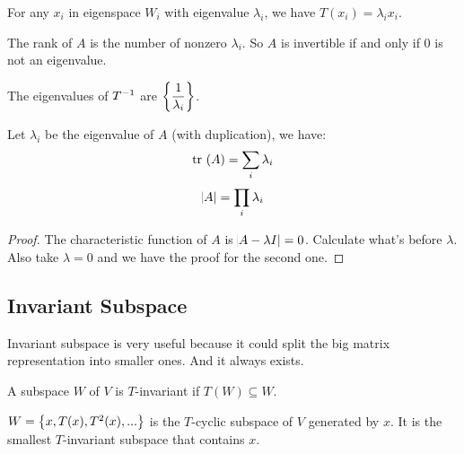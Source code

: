 \begin{theorem}
    For any $x_i$ in eigenspace $W_i$ with eigenvalue $\lambda_i$, we have $T(x_i) = \lambda_i x_i$.
\end{theorem}

\begin{theorem}
    The rank of $A$ is the number of nonzero $\lambda_i$. So $A$ is invertible if and only if $0$ is not an eigenvalue.    
\end{theorem}

\begin{theorem}
    The eigenvalues of ${T}^{-1}$ are $\displaystyle \set{\frac{1}{\lambda_i}}$.
\end{theorem}


\begin{theorem}
    Let $\lambda_i$ be the eigenvalue of $A$ (with duplication), we have:
    \begin{equation}
        \displaystyle \mathrm{tr}~( A ) = \sum_i \lambda_i
    \end{equation}
    \begin{equation}
        \abs{A} = \prod_i \lambda_i
    \end{equation}
\end{theorem}
\begin{proof}
    The characteristic function of $A$ is $\abs{A - \lambda I} = 0$. Calculate what's before $\lambda$. Also take $\lambda=0$ and we have the proof for the second one.
\end{proof}



\subsection{Invariant Subspace}

Invariant subspace is very useful because it could split the big matrix representation into smaller ones. And it always exists.

\begin{definition}[$T$-invariant]
    A subspace $W$ of $V$ is $T$-invariant if $T(W) \subseteq W$.
\end{definition}

\begin{definition}[$T$-cyclic]
    $W = \set{x, T(x), T^2(x), ...}$ is the $T$-cyclic subspace of $V$ generated by $x$. It is the smallest $T$-invariant subspace that contains $x$.
\end{definition}

